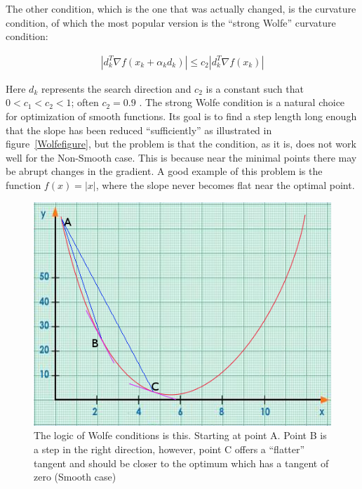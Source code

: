 The other condition, which is the one that was actually changed, is the curvature condition, of which the most popular version is the ``strong Wolfe'' curvature condition:

\begin{equation} \label{strogWolfeq}
  \begin{aligned}
    |d_k^T \nabla f(x_k + \alpha _k d_k)| \leq c_2 |d_k^T \nabla f(x_k)|
  \end{aligned}
\end{equation}

Here $d_k$ represents the search direction and $c_2$ is a constant such that $0 < c_1 < c_2 < 1$; often $c_2 = 0.9$ \citep{nocedal}. The strong Wolfe condition is a natural choice for optimization of smooth functions. Its goal is to find a step length long enough that the slope has been reduced ``sufficiently'' as illustrated in figure~\eqref{Wolfefigure}, but the problem is that the condition, as it is, does not work well for the Non-Smooth case. This is because near the minimal points there may be abrupt changes in the gradient. A good example of this problem is the function $f(x) = |x|$, where the slope never becomes flat near the optimal point.

\begin{figure} 
\begin{center}
\includegraphics[scale=0.65]{Figures/wolfe.png}
\caption[The Idea behind the Wolfe Condition]{The logic of Wolfe conditions is this. Starting at point A. Point B is a step in the right direction, however, point C offers a ``flatter'' tangent and should be closer to the optimum which has a tangent of zero (Smooth case)}
\label{Wolfefigure}
\end{center}
\end{figure}

